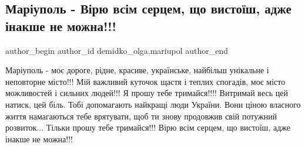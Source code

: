  
 
 
 
 

\subsection{Маріуполь - Вірю всім серцем, що вистоїш, адже інакше не можна!!!}
\label{sec:27_02_2022.fb.demidko_olga.mariupol.1.virju_vsim_sercem_scho_vystoish}

\ifcmt
 author_begin
   author_id demidko_olga.mariupol
 author_end
\fi

Маріуполь - моє дороге, рідне, красиве, українське,  найбільш унікальне і
неповторне місто!!! Мій важливий куточок щастя і теплих спогадів, моє місто
можливостей і сильних людей!!! Я прошу тебе тримайся!!!! Витримай весь цей
натиск, цей біль. Тобі допомагають найкращі люди України. Вони ціною власного
життя намагаються тебе врятувати, щоб ти знову продовжив свій потужний
розвиток... Тільки прошу тебе тримайся!!! Вірю всім серцем, що вистоїш, адже
інакше не можна!!!
